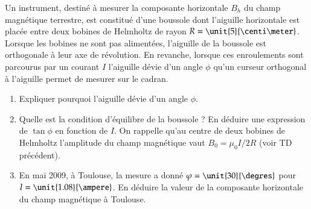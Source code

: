 \begin{exocor}
	Un instrument, destiné à mesurer la composante horizontale $B_h$
	du champ magnétique
	terrestre, est constitué d'une boussole dont l'aiguille horizontale est 
	placée entre deux bobines de Helmholtz de rayon $R = \unit{5}{\centi \meter}$. 
	Lorsque les bobines ne sont pas alimentées, l'aiguille de la boussole 
	est orthogonale à leur axe de révolution.
	En revanche, lorsque ces enroulements
	sont parcourus par un courant $I$ l'aiguille dévie d'un angle $\phi$
	qu'un curseur orthogonal à l'aiguille permet de mesurer sur le cadran.
	\begin{enumerate}
	  \item Expliquer pourquoi l'aiguille dévie d'un angle $\phi$.
    	  \item Quelle est la condition d'équilibre de la boussole ? 
	    En déduire une expression de $\tan \phi$ en fonction de $I$.
	    On rappelle qu'au centre de deux bobines de Helmholtz l'amplitude du champ 
	    magnétique vaut $B_0 = \mu_0 I/2R$ (voir TD précédent).
	  \item En mai 2009, à Toulouse, la mesure a donné $\phi = \unit{30}{\degres}$
	    pour $I = \unit{1.08}{\ampere}$. En déduire la valeur de
	    la composante horizontale du champ magnétique à Toulouse. 
	\end{enumerate}
\end{exocor}


